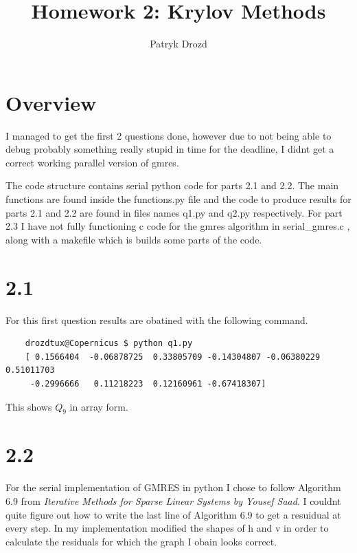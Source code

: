 \documentclass[a4paper]{article}
\title{Homework 2: Krylov Methods}
\author{Patryk Drozd}
\begin{document}
\date{}
\maketitle

\section*{Overview}
	I managed to get the first 2 questions done, however due to not being able to debug probably 
	something really stupid in time for the deadline, I didnt get a correct working parallel version of
	gmres.
		
	The code structure contains serial python code for parts 2.1 and 2.2. The main functions are found
	inside the functions.py file and the code to produce results for parts 2.1 and 2.2 are found in 
	files names q1.py and q2.py respectively. For part 2.3 I have not fully functioning c code for 
	the gmres algorithm in serial\_gmres.c , along with a makefile which is builds some parts of the
	code.

\section*{2.1}
	
	For this first question results are obatined with the following command.
	
	\begin{verbatim}
	drozdtux@Copernicus $ python q1.py
	[ 0.1566404  -0.06878725  0.33805709 -0.14304807 -0.06380229  0.51011703
	 -0.2996666   0.11218223  0.12160961 -0.67418307]
	\end{verbatim}

	This shows $Q_9$ in array form.

\section*{2.2}
	
	For the serial implementation of GMRES in python I chose to follow Algorithm 6.9 from 
	\textit{Iterative Methods for Sparse Linear Systems by Yousef Saad}. I couldnt quite figure
	out how to write the last line of Algorithm 6.9 to get a resuidual at every step. In my
	implementation modified the shapes of h and v in order to calculate the residuals for which 
	the graph I obain looks correct.
\end{document}
